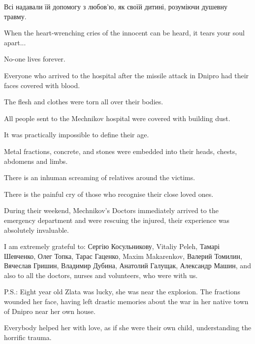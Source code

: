 Всі надавали їй допомогу з любов'ю, як своїй дитині, розуміючи душевну травму.

When the heart-wrenching cries of the innocent can be heard, it tears your soul
apart...

No-one lives forever. 

Everyone who arrived to the hospital after the missile attack in Dnipro had
their faces covered with blood. 

The flesh and clothes were torn all over  their bodies. 

All people sent to the Mechnikov hospital were covered with building dust. 

It was practically impossible to define their age.

Metal fractions, concrete, and stones were embedded into their heads, chests,
abdomens and limbs.

There is an inhuman screaming of relatives around the victims. 

There is the painful cry of those who recognise their close loved ones. 

During their weekend, Mechnikov's Doctors immediately arrived to the emergency
department and were rescuing the injured, their experience was absolutely
invaluable. 

I am extremely grateful to: Сергію Косульникову, Vitaliy Peleh, Тамарі
Шевченко, Олег Топка, Тарас Гаценко, Maxim  Makarenkov, Валерий Томилин,
Вячеслав Гришин, Владимир Дубина, Анатолий Галущак, Александр Машин, and also
to all the doctors, nurses and volunteers, who were with us. 

P.S.: Eight year old Zlata was lucky, she was near the explosion. The fractions
wounded her face, having left drastic memories about the war in her native town
of Dnipro near her own house. 

Everybody helped her with love, as if she were their own child, understanding
the horrific trauma.
